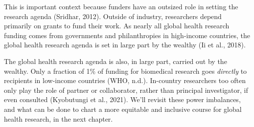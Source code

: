 \documentclass[
  letterpaper,
  DIV=11,
  numbers=noendperiod,
  oneside]{scrreprt}
\begin{document}
This is important context because funders have an outsized role in
setting the research agenda (Sridhar,
2012).
Outside of industry, researchers depend primarily on grants to fund
their work. As nearly all global health research funding comes from
governments and philanthropies in high-income countries, the global
health research agenda is set in large part by the wealthy (Ii et al.,
2018).

The global health research agenda is also, in large part, carried out by
the wealthy. Only a fraction of 1\% of funding for biomedical research
goes \emph{directly} to recipients in low-income countries (WHO,
n.d.).
In-country researchers too often only play the role of partner or
collaborator, rather than principal investigator, if even consulted
(Kyobutungi et al.,
2021).
We'll revisit these power imbalances, and what can be done to chart a
more equitable and inclusive course for global health research, in the
next chapter.
\end{document}
